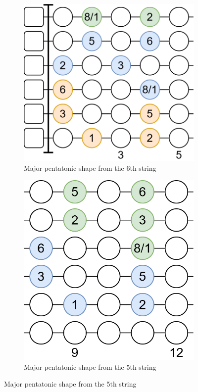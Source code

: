 \begin{figure}[h]
	\begin{subfigure}[b]{0.45\textwidth}
		\centering
		\includegraphics[height=0.175\textheight]{../../Images/guitar_major_pentatonic_standard.png}
		\caption{Major pentatonic shape from the 6th string}
		\label{fig:guitar_major_pentatonic_shape}
	\end{subfigure}
	\hfill
	\begin{subfigure}[b]{0.45\textwidth}
		\centering
		\includegraphics[height=0.175\textheight]{../../Images/guitar_major_pentatonic_standard_start_5th_string.png}
		\caption{Major pentatonic shape from the 5th string}
		\label{fig:guitar_major_pentatonic_shape_start_5th_string}
	\end{subfigure}
	

\end{figure}
